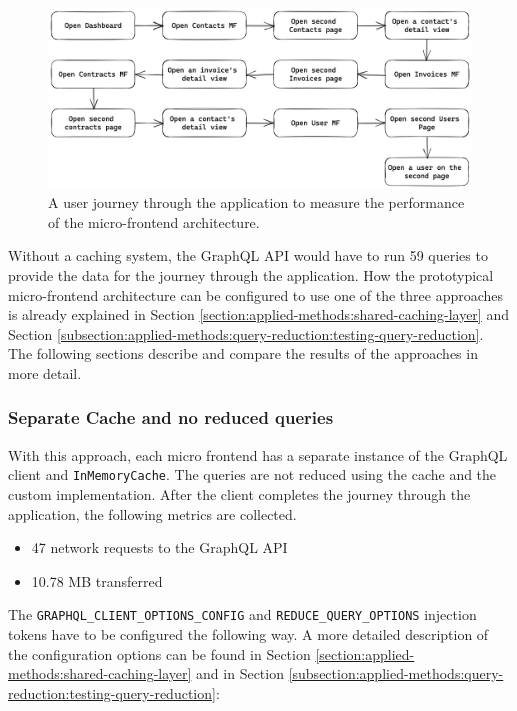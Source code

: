 \ifshowImages
\begin{figure}[H]
\centering
\includegraphics[width=1\linewidth]{images/results/evaluation-first-path.png}
\caption{A user journey through the application to measure the performance of the micro-frontend architecture.}\label{fig:results:evaluation-first-path}
\end{figure}
\fi

\noindent Without a caching system, the GraphQL \ac{API} would have to run 59 queries to provide the data for the journey through the application. How the prototypical micro-frontend architecture can be configured to use one of the three approaches is already explained in Section \ref{section:applied-methods:shared-caching-layer} and Section \ref{subsection:applied-methods:query-reduction:testing-query-reduction}. The following sections describe and compare the results of the approaches in more detail.

\subsubsection{Separate Cache and no reduced queries}\label{subsubsection:results:performance-measurement:separate-cache-no-reduction}

With this approach, each micro frontend has a separate instance of the GraphQL client and \texttt{InMemoryCache}. The queries are not reduced using the cache and the custom implementation. After the client completes the journey through the application, the following metrics are collected.

\begin{itemize}
  \item 47 network requests to the GraphQL \ac{API}
  \item 10.78 MB transferred
\end{itemize}

\noindent The \texttt{GRAPHQL\_CLIENT\_OPTIONS\_CONFIG} and \texttt{REDUCE\_QUERY\_OPTIONS} injection tokens have to be configured the following way. A more detailed description of the configuration options can be found in Section \ref{section:applied-methods:shared-caching-layer} and in Section \ref{subsection:applied-methods:query-reduction:testing-query-reduction}:

